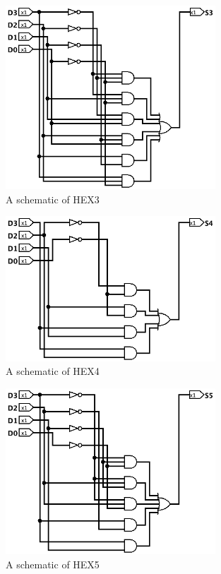 \documentclass{article}
\begin{document}
\begin{enumerate}
\begin{figure}[ht!]
    \centering
    \includegraphics[width=0.7\textwidth]{part2_hex3.png}
    \caption{A schematic of HEX3}
    \label{f:part2_hex3}
\end{figure}

\begin{figure}[ht!]
    \centering
    \includegraphics[width=0.7\textwidth]{part2_hex4.png}
    \caption{A schematic of HEX4}
    \label{f:part2_hex4}
\end{figure}

\begin{figure}[ht!]
    \centering
    \includegraphics[width=0.7\textwidth]{part2_hex5.png}
    \caption{A schematic of HEX5}
    \label{f:part2_hex5}
\end{figure}


\end{enumerate}
\end{document}
